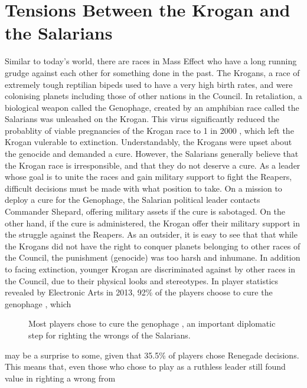 \documentclass[journal]{IEEEtran}
\begin{document}
\section{Tensions Between the Krogan and the Salarians}

Similar to today's world, there are races in Mass Effect who have a
long running grudge against each other for something done in the past.
The Krogans, a race of extremely tough reptilian bipeds used to
have a very high birth rates, and were colonising planets including those
of other nations in the Council. In retaliation, a biological weapon
called the Genophage, created by an amphibian race called the Salarians was unleashed on the Krogan.
This virus significantly reduced the
probablity of viable pregnancies of the Krogan race to 1 in 2000 \cite{wikia} ,
which left the Krogan vulerable to extinction. Understandably, the Krogans
were upset about the genocide and demanded a cure. However, the Salarians generally believe that the Krogan race is irresponsible, and that they do not deserve a cure. As a leader whose goal is to unite the races and gain military support to fight the Reapers,
difficult decisions must be made with what position to take. On a mission
to deploy a cure for the Genophage, the Salarian political leader contacts
Commander Shepard, offering military assets if the cure is sabotaged. On the
other hand, if the cure is administered, the Krogan offer their military support
in the struggle against the Reapers. As an outsider, it is easy to see that that while the Krogans did not have the right to conquer planets belonging to other races of the Council, the punishment (genocide) was too harsh and inhumane. In addition to facing extinction, younger Krogan are discriminated against by other races in
the Council, due to their physical looks and stereotypes.
In player statistics revealed by Electronic Arts in 2013, 92\% of the players choose to cure the genophage \cite{ea}, which
\begin{figure}[h!]
 \centering
 \caption{Most players chose to cure the genophage \cite{ea}, an important diplomatic step for righting the wrongs of the Salarians.}
\end{figure}
may be a surprise to some, given that 35.5\% of players chose Renegade decisions. This means that, even those who
chose to play as a ruthless leader still found value in righting a wrong from
\end{document}
